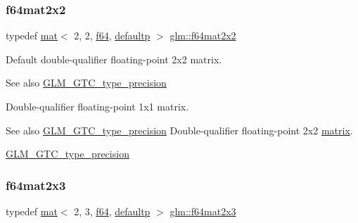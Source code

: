 \subsubsection{\texorpdfstring{f64mat2x2}{f64mat2x2}}
{\footnotesize\ttfamily typedef \mbox{\hyperlink{structglm_1_1mat}{mat}}$<$ 2, 2, \mbox{\hyperlink{group__gtc__type__precision_ga2bba392e555124b36cde6abba349bab3}{f64}}, \mbox{\hyperlink{namespaceglm_a36ed105b07c7746804d7fdc7cc90ff25a9d21ccd8b5a009ec7eb7677befc3bf51}{defaultp}} $>$ \mbox{\hyperlink{group__gtc__type__precision_gae18de078e2885803ceda215c6e04a08a}{glm\+::f64mat2x2}}}

Default double-\/qualifier floating-\/point 2x2 matrix. \begin{DoxySeeAlso}{See also}
\mbox{\hyperlink{group__gtc__type__precision}{G\+L\+M\+\_\+\+G\+T\+C\+\_\+type\+\_\+precision}}
\end{DoxySeeAlso}
Double-\/qualifier floating-\/point 1x1 matrix. \begin{DoxySeeAlso}{See also}
\mbox{\hyperlink{group__gtc__type__precision}{G\+L\+M\+\_\+\+G\+T\+C\+\_\+type\+\_\+precision}} Double-\/qualifier floating-\/point 2x2 \mbox{\hyperlink{_s_d_l__opengl__glext_8h_a7b24a3f2f56eb1244ae69dacb4fecb6f}{matrix}}. 

\mbox{\hyperlink{group__gtc__type__precision}{G\+L\+M\+\_\+\+G\+T\+C\+\_\+type\+\_\+precision}} 
\end{DoxySeeAlso}
\mbox{\label{group__gtc__type__precision_ga7816d266eaf216e384c3c6d1e570b9f3}} 
\subsubsection{\texorpdfstring{f64mat2x3}{f64mat2x3}}
{\footnotesize\ttfamily typedef \mbox{\hyperlink{structglm_1_1mat}{mat}}$<$ 2, 3, \mbox{\hyperlink{group__gtc__type__precision_ga2bba392e555124b36cde6abba349bab3}{f64}}, \mbox{\hyperlink{namespaceglm_a36ed105b07c7746804d7fdc7cc90ff25a9d21ccd8b5a009ec7eb7677befc3bf51}{defaultp}} $>$ \mbox{\hyperlink{group__gtc__type__precision_ga7816d266eaf216e384c3c6d1e570b9f3}{glm\+::f64mat2x3}}}

